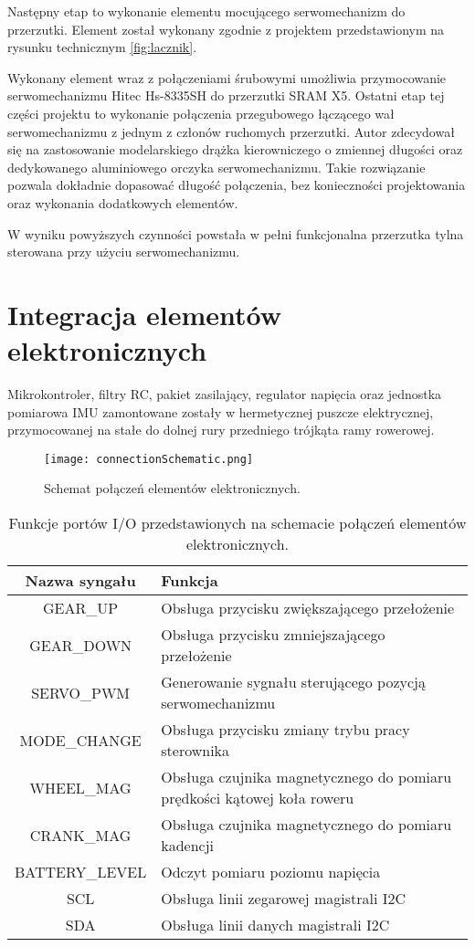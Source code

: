 Następny etap to wykonanie elementu mocującego serwomechanizm do przerzutki. Element został wykonany zgodnie z projektem przedstawionym na rysunku technicznym \ref{fig:lacznik}.


Wykonany element wraz z połączeniami śrubowymi umożliwia przymocowanie serwomechanizmu Hitec Hs-8335SH do przerzutki SRAM X5. Ostatni etap tej części projektu to wykonanie połączenia przegubowego łączącego wał serwomechanizmu z jednym z członów ruchomych przerzutki. Autor zdecydował się na zastosowanie modelarskiego drążka kierowniczego o zmiennej długości oraz dedykowanego aluminiowego orczyka serwomechanizmu. Takie rozwiązanie pozwala dokładnie dopasować długość  połączenia, bez konieczności projektowania oraz wykonania dodatkowych elementów.

W wyniku powyższych czynności powstała w pełni funkcjonalna przerzutka tylna sterowana przy użyciu serwomechanizmu. 

\section{Integracja elementów elektronicznych}
Mikrokontroler, filtry RC, pakiet zasilający, regulator napięcia oraz jednostka pomiarowa IMU zamontowane zostały w hermetycznej puszcze elektrycznej, przymocowanej na stałe do dolnej rury przedniego trójkąta ramy rowerowej.

\begin{figure}[h]
    \centering
    \texttt{[image: connectionSchematic.png]}
    \caption{Schemat połączeń elementów elektronicznych.}
    \label{fig:schematPolaczen}
\end{figure}

\begin{table}[h]
    \caption{Funkcje portów I/O przedstawionych na schemacie połączeń elementów elektronicznych.}
    \begin{center}
		\label{tab:portyGPIO}
		\begin{tabular}{|c|>{\centering}m{8cm}|}
 			\hline
 			\textbf{Nazwa syngału} & \textbf{Funkcja} \tabularnewline
 			\hline
 			GEAR\_UP & Obsługa przycisku zwiększającego przełożenie \tabularnewline
 			\hline
 			GEAR\_DOWN &  Obsługa przycisku zmniejszającego przełożenie \tabularnewline
 			\hline
 			SERVO\_PWM & Generowanie sygnału sterującego pozycją serwomechanizmu \tabularnewline
 			\hline
 			MODE\_CHANGE &  Obsługa przycisku zmiany trybu pracy sterownika\tabularnewline
 			\hline
 			WHEEL\_MAG & Obsługa czujnika magnetycznego do pomiaru prędkości kątowej koła roweru \tabularnewline
 			\hline
 			CRANK\_MAG & Obsługa czujnika magnetycznego do pomiaru kadencji \tabularnewline
 			\hline
 			BATTERY\_LEVEL & Odczyt pomiaru poziomu napięcia \tabularnewline
 			\hline
 			SCL &  Obsługa linii zegarowej magistrali I2C \tabularnewline
 			\hline
 			SDA & Obsługa linii danych magistrali I2C \tabularnewline
 			\hline
		\end{tabular}
	\end{center}
\end{table}

